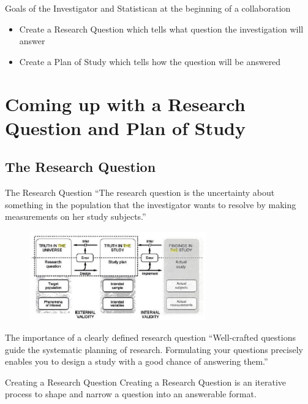 \documentclass[14pt]{beamer}
\begin{document}
\begin{frame}{Goals of the Investigator and Statistican at the beginning of
a collaboration}
\begin{itemize}
\item Create a Research Question which tells what question the investigation 
  will answer
\item Create a Plan of Study which tells how the question will be answered
\end{itemize}
\end{frame}

\section{Coming up with a Research Question and Plan of Study}

\subsection{The Research Question}

\begin{frame}{The Research Question}
``The research question is the uncertainty about something in the population
that the investigator wants to resolve by making measurements on her
study subjects.'' \cite{Hulley2001}
\begin{figure}
\includegraphics[width=3in]{Screenshot.png}
\end{figure}
\end{frame}

\begin{frame}{The importance of a clearly defined research question}
``Well-crafted questions guide the systematic planning of research.  
Formulating your questions precisely enables you to design a study with a 
good chance of answering them.'' \cite{Light1990}
\end{frame}

\begin{frame}{Creating a Research Question}
Creating a Research Question is an iterative process to shape and narrow
a question into an answerable format.
\end{frame}
\end{document}
